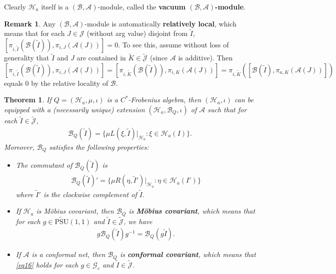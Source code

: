 \documentclass[11pt,b5paper,notitlepage]{article}
\theoremstyle{definition}
\newtheorem{rem}[df]{Remark}
\theoremstyle{plain}
\newtheorem{thm}[df]{Theorem}
\newcommand{\mc}{\mathcal}
\newcommand{\wtd}{\widetilde}
\newcommand{\Jtd}{\widetilde{\mathcal J}}
\newcommand{\UPSU}{\widetilde{\mathrm{PSU}}(1,1)}
\newcommand{\Gc}{\mathscr G_c}
\numberwithin{equation}{section}
\begin{document}
Clearly $\mc H_a$ itself is a $(\mc B,\mc A)$-module, called the \textbf{vacuum $(\mc B,\mc A)$-module}.
	
	

\begin{rem}\label{lb17}
Any $(\mc B,\mc A)$-module is automatically \textbf{relatively local}, which means that for each $J\in\mc J$ (without arg value) disjoint from $\wtd I$, $[\pi_{i,\wtd I}(\mc B(\wtd I)),\pi_{i,J}(\mc A(J))]=0$. To see this, assume without loss of generality that $\wtd I$ and $J$ are contained in $\wtd K\in\Jtd$ (since $\mc A$ is additive). Then $[\pi_{i,\wtd I}(\mc B(\wtd I)),\pi_{i,J}(\mc A(J))]=[\pi_{i,\wtd K}(\mc B(\wtd I)),\pi_{i,K}(\mc A(J))]=\pi_{i,\wtd K}([\mc B(\wtd I),\pi_{a,K}(\mc A(J))])$ equals $0$ by the relative locality of $\mc B$.
\end{rem}


\begin{thm}\label{lb5}
If $Q=(\mc H_a,\mu,\iota)$ is a $C^*$-Frobenius algebra, then $(\mc H_a,\iota)$ can be equipped with a (necessarily unique)  extension $(\mc H_a,\mc B_Q,\iota)$ of $\mc A$ such that for each $\wtd I\in\Jtd$,
\begin{align}
\mc B_Q(\wtd I)=\{\mu L(\xi,\wtd I)|_{\mc H_a}:\xi\in\mc H_a(I)\}.	\label{eq28}
\end{align}
Moreover, $\mc B_Q$ satisfies the following properties:
\begin{itemize}
\item The commutant of $\mc B_Q(\wtd I)$ is
\begin{align}
\mc B_Q(\wtd I)'=\{\mu R(\eta,\wtd I')|_{\mc H_a}:\eta\in\mc H_a(I')\}\label{eq20}	
\end{align}
where $\wtd I'$ is the clockwise complement of $\wtd I$.
\item If $\mc H_a$ is M\"obius covariant, then $\mc B_Q$ is \textbf{M\"obius covariant}, which means that for each $g\in\UPSU$ and $\wtd I\in\Jtd$, we have
\begin{align}
g\mc B_Q(\wtd I)g^{-1}=\mc B_Q(g\wtd I).\label{eq16}	
\end{align} 
\item If $\mc A$ is a conformal net, then $\mc B_Q$ is \textbf{conformal covariant}, which means that \eqref{eq16} holds for each $g\in\Gc$ and $\wtd I\in\Jtd$.
\end{itemize}
\end{thm}
\end{document}
